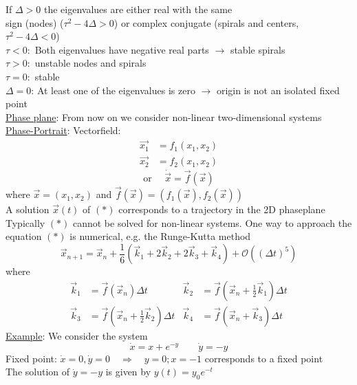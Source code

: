 \noindent If $\Delta>0$ the eigenvalues are either real with the same \\
sign (nodes) ($\tau^2-4\Delta>0$) or complex conjugate (spirals and centers, $\tau^2-4\Delta<0$)\\
$\tau<0:$ Both eigenvalues have negative real parts $\to$ stable spirals\\
$\tau>0:$ unstable nodes and spirals\\
$\tau=0:$ stable\\
$\Delta=0$: At least one of the eigenvalues is zero $\to$ origin is not an isolated fixed point\\
\underline{Phase plane}: From now on we consider non-linear two-dimensional systems\\
\underline{Phase-Portrait}: Vectorfield:
\begin{align*}
	\vec{x_1}&=f_1(x_1,x_2)\\
	\vec{x_2}&=f_2(x_1,x_2)
\end{align*}
\begin{equation*}
	\text{or }\quad \dot{\vec{x}}=\vec{f}(\vec{x})
\end{equation*}
where $\vec{x}=(x_1,x_2)$ and $\vec{f}(\vec{x})=(f_1(\vec{x}),f_2(\vec{x}))$\\
A solution $\vec{x}(t)$ of $(\ast)$ corresponds to a trajectory in the 2D phaseplane\\
Typically $(\ast)$ cannot be solved for non-linear systems. One way to approach the equation $(\ast)$ is numerical, e.g. the Runge-Kutta method
\begin{equation*}
	\vec{x}_{n+1}=\vec{x}_n+\frac{1}{6}\left(\vec{k}_1+2\vec{k}_2+2\vec{k}_3+\vec{k}_4\right)+\mathcal{O}\left((\Delta t)^5\right)
\end{equation*}
where
\begin{align*}
	\vec{k}_1&=\vec{f}\left(\vec{x}_n\right)\Delta t & \vec{k}_2&=\vec{f}\left(\vec{x}_n+\frac{1}{2}\vec{k}_1\right)\Delta t\\
	\vec{k}_3&=\vec{f}\left(\vec{x}_n+\frac{1}{2}\vec{k}_2\right)\Delta t & \vec{k}_4&=\vec{f}\left(\vec{x}_n+\vec{k}_3\right)\Delta t
\end{align*}
\underline{Example}: We consider the system
\begin{equation*}
	\dot{x}=x+e^{-y} \qquad \dot{y}=-y
\end{equation*}
Fixed point: $\dot{x}=0,\dot{y}=0\quad\Rightarrow\quad y=0; x=-1$ corresponds to a fixed point\\
The solution of $\dot{y}=-y$ is given by $y(t)=y_0e^{-t}$\\
